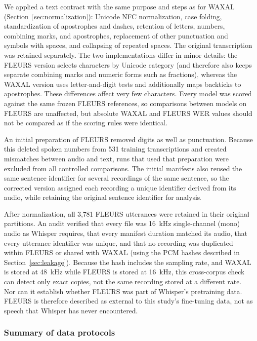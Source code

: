 We applied a text contract with the same purpose and steps as for WAXAL
(Section~\ref{sec:normalization}): Unicode NFC normalization, case folding,
standardization of apostrophes and dashes, retention of letters, numbers,
combining marks, and apostrophes, replacement of other punctuation and symbols
with spaces, and collapsing of repeated spaces. The original transcription was
retained separately. The two implementations differ in minor details: the
FLEURS version selects characters by Unicode category (and therefore also keeps
separate combining marks and numeric forms such as fractions), whereas the
WAXAL version uses letter-and-digit tests and additionally maps backticks to
apostrophes. These differences affect very few characters. Every model was
scored against the same frozen FLEURS references, so comparisons between
models on FLEURS are unaffected, but absolute WAXAL and FLEURS WER values should
not be compared as if the scoring rules were identical.

An initial preparation of FLEURS removed digits as well as punctuation. Because
this deleted spoken numbers from 531 training transcriptions and created
mismatches between audio and text, runs that used that preparation were
excluded from all controlled comparisons. The initial manifests also reused the
same sentence identifier for several recordings of the same sentence, so the
corrected version assigned each recording a unique identifier derived from its
audio, while retaining the original sentence identifier for analysis.

After normalization, all 3,781 FLEURS utterances were retained in their original
partitions. An audit verified that every file was 16~kHz single-channel (mono)
audio as Whisper requires, that every manifest duration matched its audio, that
every utterance identifier was unique, and that no recording was duplicated
within FLEURS or shared with WAXAL (using the PCM hashes described in
Section~\ref{sec:leakage}). Because the hash includes the sampling rate, and
WAXAL is stored at 48~kHz while FLEURS is stored at 16~kHz, this cross-corpus
check can detect only exact copies, not the same recording stored at a different
rate. Nor can it establish whether FLEURS was part of Whisper's pretraining
data. FLEURS is therefore described as external to this study's fine-tuning
data, not as speech that Whisper has never encountered.

\subsubsection{Summary of data protocols}

